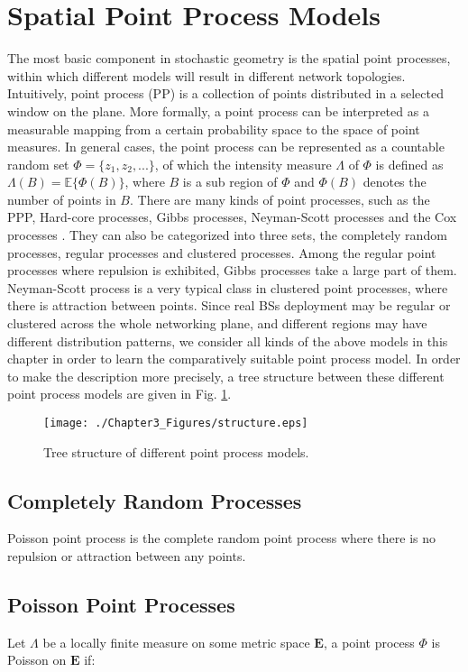 \section{Spatial Point Process Models} \label{sec3-3}
The most basic component in stochastic geometry is the spatial point processes, within which different models will result in different network topologies. Intuitively, point process (PP) is a collection of points distributed in a selected window on the plane. More formally, a point process can be interpreted as a measurable mapping from a certain probability space to the space of point measures. In general cases, the point process can be represented as a countable random set $\Phi=\{z_1,z_2,...\}$, of which the intensity measure $\Lambda$ of $\Phi$ is defined as $\Lambda(B)=\mathbb{E}\{\Phi(B)\}$, where $B$ is a sub region of $\Phi$ and $\Phi(B)$ denotes the number of points in $B$.
There are many kinds of point processes, such as the PPP, Hard-core processes, Gibbs processes, Neyman-Scott processes and the Cox processes \cite{chiu2013stochastic, neyman1972processes}. They can also be categorized into three sets, the completely random processes, regular processes and clustered processes. Among the regular point processes where repulsion is exhibited, Gibbs processes take a large part of them. Neyman-Scott process is a very typical class in clustered point processes, where there is attraction between points. Since real BSs deployment may be regular or clustered across the whole networking plane, and different regions may have different distribution patterns, we consider all kinds of the above models in this chapter in order to learn the comparatively suitable point process model. In order to make the description more precisely, a tree structure between these different point process models are given in Fig. \ref{fig:structure}.

\begin{figure}[!htb]
\centering
\texttt{[image: ./Chapter3\_Figures/structure.eps]}
\centering
\caption{Tree structure of different point process models.}
\label{fig:structure}
\end{figure}

\subsection{Completely Random Processes}
Poisson point process is the complete random point process where there is no repulsion or attraction between any points.
\subsection*{Poisson Point Processes}
Let $\Lambda$ be a locally finite measure on some metric space $\mathbf{E}$, a point process $\Phi$ is Poisson on $\mathbf{E}$ if:

